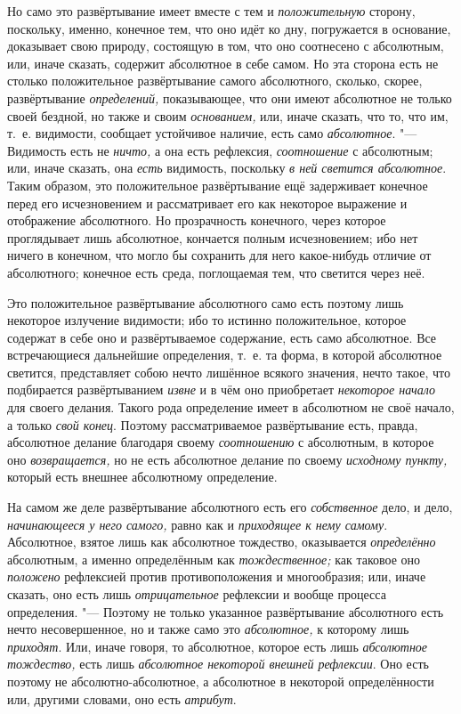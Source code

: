 Но само это развёртывание имеет вместе с тем и
{\em положительную} сторону, поскольку, именно,
конечное тем, что оно идёт ко дну, погружается в основание, доказывает свою
природу, состоящую в том, что оно соотнесено с абсолютным, или, иначе
сказать, содержит абсолютное в себе самом. Но эта сторона есть не столько
положительное развёртывание самого абсолютного, сколько, скорее,
развёртывание {\em определений,} показывающее, что они
имеют абсолютное не только своей бездной, но также и своим
{\em основанием,} или, иначе сказать, что то, что им,
т.~е. видимости, сообщает устойчивое наличие, есть само
{\em абсолютное}. "--- Видимость есть не
{\em ничто,} а она есть рефлексия,
{\em соотношение} с абсолютным; или, иначе сказать, она
{\em есть} видимость, поскольку
{\em в ней светится абсолютное}. Таким образом, это
положительное развёртывание ещё задерживает конечное перед его
исчезновением и рассматривает его как некоторое выражение и отображение
абсолютного. Но прозрачность конечного, через которое проглядывает лишь
абсолютное, кончается полным исчезновением; ибо нет ничего в конечном, что
могло бы сохранить для него какое-нибудь отличие от абсолютного; конечное
есть среда, поглощаемая тем, что светится через неё.

Это положительное развёртывание абсолютного само есть поэтому лишь некоторое
излучение видимости; ибо то истинно положительное, которое содержат в себе
оно и развёртываемое содержание, есть само абсолютное. Все встречающиеся
дальнейшие определения, т.~е. та форма, в которой абсолютное светится,
представляет собою нечто лишённое всякого значения, нечто такое, что
подбирается развёртыванием {\em извне} и в чём оно
приобретает {\em некоторое начало} для своего делания.
Такого рода определение имеет в абсолютном не своё начало, а только
{\em свой конец}. Поэтому рассматриваемое развёртывание
есть, правда, абсолютное делание благодаря своему
{\em соотношению} с абсолютным, в которое оно
{\em возвращается,} но не есть абсолютное делание по
своему {\em исходному пункту,} который есть внешнее
абсолютному определение.

На самом же деле развёртывание абсолютного есть его
{\em собственное} дело, и дело,
{\em начинающееся у него самого,} равно как и
{\em приходящее к нему самому}. Абсолютное, взятое лишь
как абсолютное тождество, оказывается {\em определённо}
абсолютным, а именно определённым как
{\em тождественное;} как таковое оно
{\em положено} рефлексией против противоположения и
многообразия; или, иначе сказать, оно есть лишь
{\em отрицательное} рефлексии и вообще процесса
определения. "--- Поэтому не только указанное развёртывание абсолютного есть
нечто несовершенное, но и также само это
{\em абсолютное,} к которому лишь
{\em приходят}. Или, иначе говоря, то абсолютное,
которое есть лишь {\em абсолютное тождество,} есть лишь
{\em абсолютное некоторой внешней рефлексии}. Оно есть
поэтому не абсолютно-абсолютное, а абсолютное в некоторой определённости
или, другими словами, оно есть {\em атрибут}.

